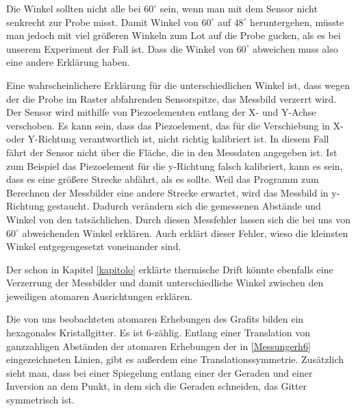 \documentclass[10pt,a4paper]{article}
\begin{document}
Die Winkel sollten nicht alle bei $60^\circ$ sein, wenn man mit dem Sensor nicht senkrecht zur Probe misst. Damit Winkel von $60^\circ$ auf $48^\circ$ heruntergehen, müsste man jedoch mit viel größeren Winkeln zum Lot auf die Probe gucken, als es bei unserem Experiment der Fall ist. Dass die Winkel von $60^\circ$ abweichen muss also eine andere Erklärung haben.

Eine wahrscheinlichere Erklärung für die unterschiedlichen Winkel ist, dass wegen der die Probe im Raster abfahrenden Sensorspitze, das Messbild verzerrt wird. Der Sensor wird mithilfe von Piezoelementen entlang der X- und Y-Achse verschoben. Es kann sein, dass das Piezoelement, das für die Verschiebung in X- oder Y-Richtung verantwortlich ist, nicht richtig kalibriert ist. In diesem Fall fährt der Sensor nicht über die Fläche, die in den Messdaten angegeben ist. Ist zum Beispiel das Piezoelement für die y-Richtung falsch kalibriert, kann es sein, dass es eine größere Strecke abfährt, als es sollte. Weil das Programm zum Berechnen der Messbilder eine andere Strecke erwartet, wird das Messbild in y-Richtung gestaucht. Dadurch verändern sich die gemessenen Abstände und Winkel von den tatsächlichen. Durch diesen Messfehler lassen sich die bei uns von $60^\circ$ abweichenden Winkel erklären. Auch erklärt dieser Fehler, wieso die kleinsten Winkel entgegengesetzt voneinander sind.

Der schon in Kapitel \ref{kapitolo} erklärte thermische Drift könnte ebenfalls eine Verzerrung der Messbilder und damit unterschiedliche Winkel zwischen den jeweiligen atomaren Ausrichtungen erklären.

Die von uns beobachteten atomaren Erhebungen des Grafits bilden ein hexagonales Kristallgitter. Es ist 6-zählig. Entlang einer Translation von ganzzahligen Abständen der atomaren Erhebungen der in \ref{Messungerh6} eingezeichneten Linien, gibt es außerdem eine Translationssymmetrie. Zusätzlich sieht man, dass bei einer Spiegelung entlang einer der Geraden und einer Inversion an dem Punkt, in dem sich die Geraden schneiden, das Gitter symmetrisch ist.
\end{document}
